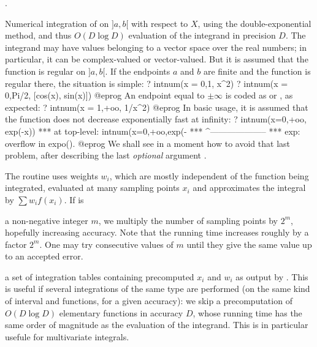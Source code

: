 .

\label{se:intnum}
Numerical integration
of  on $]a,b[$ with respect to $X$, using the
double-exponential method, and thus $O(D\log D)$ evaluation of
the integrand in precision $D$. The integrand may have values
belonging to a vector space over the real numbers; in particular, it can be
complex-valued or vector-valued. But it is assumed that the function is
regular on $]a,b[$. If the endpoints $a$ and $b$ are finite and the
function is regular there, the situation is simple:
\bprog
? intnum(x = 0,1, x^2)
? intnum(x = 0,Pi/2, [cos(x), sin(x)])
@eprog\noindent
An endpoint equal to $\pm\infty$ is coded as  or , as
expected:
\bprog
? intnum(x = 1,+oo, 1/x^2)
@eprog\noindent
In basic usage, it is assumed that the function does not decrease
exponentially fast at infinity:
\bprog
? intnum(x=0,+oo, exp(-x))
  ***   at top-level: intnum(x=0,+oo,exp(-
  ***                 ^--------------------
  *** exp: overflow in expo().
@eprog\noindent
We shall see in a moment how to avoid that last problem, after describing
the last \emph{optional} argument .

The routine uses weights $w_i$, which are mostly independent of the function
being integrated, evaluated at many sampling points $x_i$ and
approximates the integral by $\sum w_i f(x_i)$. If  is

\item a non-negative integer $m$, we multiply the number of sampling points
by $2^m$, hopefully increasing accuracy. Note that the running time
increases roughly by a factor $2^m$. One may try consecutive values of $m$
until they give the same value up to an accepted error.

\item a set of integration tables containing precomputed $x_i$ and $w_i$
as output by . This is useful if several integrations of
the same type are performed (on the same kind of interval and functions,
for a given accuracy): we skip a precomputation of $O(D\log D)$
elementary functions in accuracy $D$, whose running time has the same order
of magnitude as the evaluation of the integrand. This is in particular
usefule for multivariate integrals.

